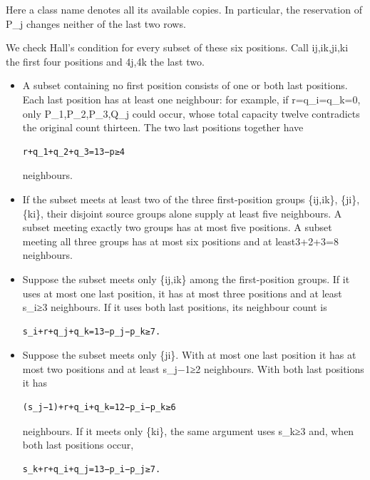 \documentclass[
  10pt,
]{article}
\begin{document}
Here a class name denotes all its available copies. In particular, the
reservation of P\_j changes neither of the last two rows.

We check Hall's condition for every subset of these six positions. Call
ij,ik,ji,ki the first four positions and 4j,4k the last two.

\begin{itemize}
\item
  A subset containing no first position consists of one or both last
  positions. Each last position has at least one neighbour: for example,
  if r=q\_i=q\_k=0, only P\_1,P\_2,P\_3,Q\_j could occur, whose total
  capacity twelve contradicts the original count thirteen. The two last
  positions together have

\begin{verbatim}
r+q_1+q_2+q_3=13−p≥4
\end{verbatim}

  neighbours.
\item
  If the subset meets at least two of the three first-position groups
  \{ij,ik\}, \{ji\}, \{ki\}, their disjoint source groups alone supply
  at least five neighbours. A subset meeting exactly two groups has at
  most five positions. A subset meeting all three groups has at most six
  positions and at least3+2+3=8 neighbours.
\item
  Suppose the subset meets only \{ij,ik\} among the first-position
  groups. If it uses at most one last position, it has at most three
  positions and at least s\_i≥3 neighbours. If it uses both last
  positions, its neighbour count is

\begin{verbatim}
s_i+r+q_j+q_k=13−p_j−p_k≥7.
\end{verbatim}
\item
  Suppose the subset meets only \{ji\}. With at most one last position
  it has at most two positions and at least s\_j−1≥2 neighbours. With
  both last positions it has

\begin{verbatim}
(s_j−1)+r+q_i+q_k=12−p_i−p_k≥6
\end{verbatim}

  neighbours. If it meets only \{ki\}, the same argument uses s\_k≥3
  and, when both last positions occur,

\begin{verbatim}
s_k+r+q_i+q_j=13−p_i−p_j≥7.
\end{verbatim}
\end{itemize}
\end{document}
